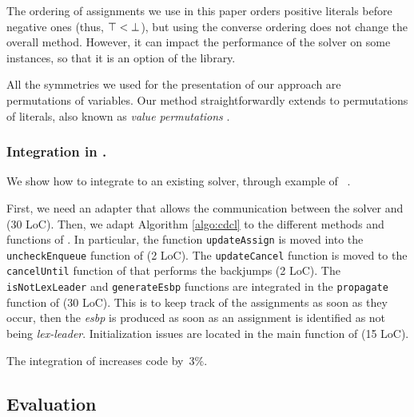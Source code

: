The ordering of assignments we use in this paper orders positive literals
before negative ones (thus, $\top < \bot$), but using the converse
ordering does not change the overall method. However, it can impact the
performance of the solver on some instances, so that it is an option of the
library.

All the symmetries we used for the presentation of our approach are
permutations of variables. Our method straightforwardly extends to permutations of literals, also known as \emph{value permutations} \cite{biere2009handbook}.




\subsubsection{Integration in \minisat{}.} We show how to integrate \libdsb{}
to an existing solver, through example of \minisat{}~\cite{een2003extensible}.

First, we need an adapter that allows the communication between the solver and
\libdsb{} (30 LoC). Then, we adapt Algorithm \ref{algo:cdcl} to the different
methods and functions of \minisat{}. In particular, the function
\texttt{updateAssign} is moved into the \texttt{uncheckEnqueue} function of
\minisat{} (2 LoC). The \texttt{updateCancel} function is moved to the
\texttt{cancelUntil} function of \minisat{} that performs the backjumps (2
LoC). The \texttt{isNotLexLeader} and \texttt{generateEsbp} functions are
integrated in the \texttt{propagate} function of \minisat{} (30 LoC). This is
to keep track of the assignments as soon as they occur, then the
\textit{esbp} is produced as soon as an assignment is identified as not being
\emph{lex-leader}. Initialization issues are located in the main function of
\minisat (15 LoC).

The integration of \libdsb{} increases \minisat{} code by~3\%.
 

\subsection{Evaluation}

%


